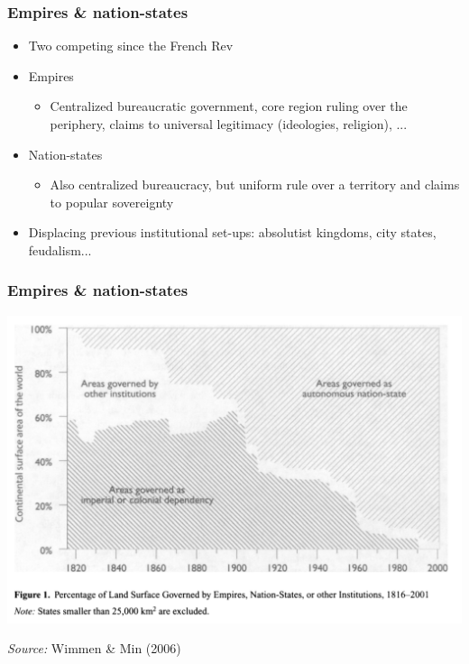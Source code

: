 \documentclass[aspectratio=43]{beamer}
\begin{document}
\begin{frame}
\frametitle{Empires \& nation-states}
\centering

\begin{itemize}
  \item Two competing  since the French Rev
  \item Empires
  \begin{itemize}
    \item Centralized bureaucratic government, core region ruling over the periphery, claims to universal legitimacy (ideologies, religion), ...
  \end{itemize}
  \item Nation-states
  \begin{itemize}
    \item Also centralized bureaucracy, but uniform rule over a territory and claims to popular sovereignty
  \end{itemize}
  \item Displacing previous institutional set-ups: absolutist kingdoms, city states, feudalism...
\end{itemize}

\end{frame}

\begin{frame}
\frametitle{Empires \& nation-states}
\centering

\includegraphics[width = \textwidth]{img/wimmer_min_fig1}

{\scriptsize \textit{Source:} Wimmen \& Min (2006)}

\end{frame}
\end{document}
